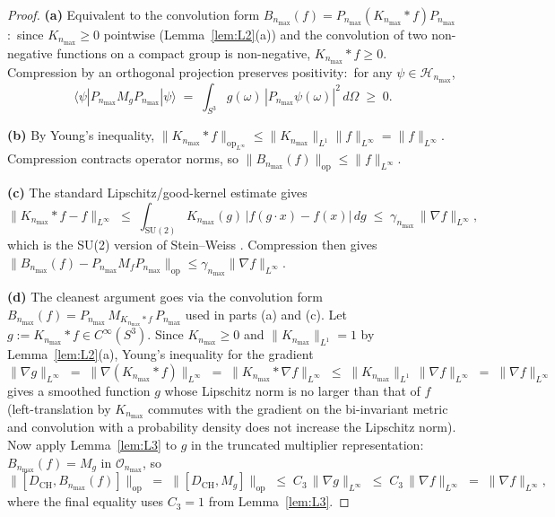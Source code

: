 \documentclass[11pt,a4paper]{article}
\theoremstyle{plain}
\theoremstyle{definition}
\newcommand{\nmax}{n_{\max}}
\newcommand{\sthree}{S^{3}}
\newcommand{\Hilb}{\mathcal{H}}
\newcommand{\Op}{\mathcal{O}}
\newcommand{\opnorm}[1]{\lVert #1 \rVert_{\mathrm{op}}}
\newcommand{\norm}[1]{\lVert #1 \rVert}
\newcommand{\SU}{\mathrm{SU}}
\newcommand{\Mat}{M}
\newcommand{\DCH}{D_{\mathrm{CH}}}
\newcommand{\KS}{K}
\begin{document}
\begin{proof}
\textbf{(a)} Equivalent to the convolution form
$B_{\nmax}(f) = P_{\nmax} (\KS_{\nmax} * f) P_{\nmax}$:\ since
$\KS_{\nmax} \ge 0$ pointwise (Lemma~\ref{lem:L2}(a)) and the
convolution of two non-negative functions on a compact group is
non-negative, $\KS_{\nmax} * f \ge 0$. Compression by an orthogonal
projection preserves positivity:\ for any $\psi \in \Hilb_{\nmax}$,
\begin{equation*}
\langle \psi | P_{\nmax} \Mat_g P_{\nmax} | \psi \rangle
\;=\; \int_{\sthree} g(\omega)\,|P_{\nmax} \psi(\omega)|^2\,d\Omega \;\ge\; 0.
\end{equation*}

\textbf{(b)} By Young's inequality,
$\opnorm{\KS_{\nmax} * f}_{L^\infty} \le \norm{\KS_{\nmax}}_{L^1}
\norm{f}_{L^\infty} = \norm{f}_{L^\infty}$. Compression contracts
operator norms, so $\opnorm{B_{\nmax}(f)} \le \norm{f}_{L^\infty}$.

\textbf{(c)} The standard Lipschitz/good-kernel estimate gives
\begin{equation*}
   \norm{\KS_{\nmax} * f - f}_{L^\infty}
   \;\le\; \int_{\SU(2)} \KS_{\nmax}(g)\,|f(g \cdot x) - f(x)|\,dg
   \;\le\; \gamma_{\nmax}\,\norm{\nabla f}_{L^\infty},
\end{equation*}
which is the SU(2) version of Stein--Weiss \cite[\S I.1]{stein_weiss1971}.
Compression then gives
$\opnorm{B_{\nmax}(f) - P_{\nmax} \Mat_f P_{\nmax}}
\le \gamma_{\nmax}\norm{\nabla f}_{L^\infty}$.

\textbf{(d)} The cleanest argument goes via the convolution form
$B_{\nmax}(f) = P_{\nmax}\,\Mat_{\KS_{\nmax} * f}\,P_{\nmax}$ used in
parts (a) and (c). Let $g := \KS_{\nmax} * f \in C^\infty(\sthree)$.
Since $\KS_{\nmax} \ge 0$ and
$\norm{\KS_{\nmax}}_{L^1} = 1$ by Lemma~\ref{lem:L2}(a), Young's
inequality for the gradient
\begin{equation}\label{eq:young_gradient}
   \norm{\nabla g}_{L^\infty}
   \;=\; \norm{\nabla(\KS_{\nmax} * f)}_{L^\infty}
   \;=\; \norm{\KS_{\nmax} * \nabla f}_{L^\infty}
   \;\le\; \norm{\KS_{\nmax}}_{L^1}\,\norm{\nabla f}_{L^\infty}
   \;=\; \norm{\nabla f}_{L^\infty}
\end{equation}
gives a smoothed function $g$ whose Lipschitz norm is no larger than
that of $f$ (left-translation by $\KS_{\nmax}$ commutes with the
gradient on the bi-invariant metric and convolution with a probability
density does not increase the Lipschitz norm). Now apply
Lemma~\ref{lem:L3} to $g$ in the truncated multiplier representation:
$B_{\nmax}(f) = \Mat_g$ in $\Op_{\nmax}$, so
\begin{equation*}
   \opnorm{[\DCH, B_{\nmax}(f)]}
   \;=\; \opnorm{[\DCH, \Mat_g]}
   \;\le\; C_3\,\norm{\nabla g}_{L^\infty}
   \;\le\; C_3\,\norm{\nabla f}_{L^\infty}
   \;=\; \norm{\nabla f}_{L^\infty},
\end{equation*}
where the final equality uses $C_3 = 1$ from Lemma~\ref{lem:L3}.
\end{proof}
\end{document}
